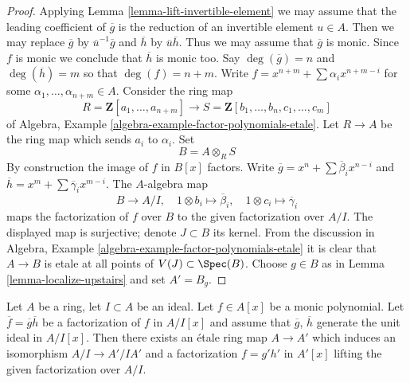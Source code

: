 \begin{proof}
Applying Lemma \ref{lemma-lift-invertible-element} we may assume that
the leading coefficient of $\overline{g}$ is the reduction of an
invertible element $u \in A$. Then we may replace $\overline{g}$ by
$\overline{u}^{-1}\overline{g}$ and $\overline{h}$ by
$\overline{u}\overline{h}$. Thus we may assume that $\overline{g}$
is monic. Since $f$ is monic we conclude that $\overline{h}$ is monic
too. Say $\deg(\overline{g}) = n$ and $\deg(\overline{h}) = m$ so
that $\deg(f) = n + m$. Write $f = x^{n + m} + \sum \alpha_i x^{n + m - i}$
for some $\alpha_1, \ldots, \alpha_{n + m} \in A$. Consider the ring map
$$
R = \mathbf{Z}[a_1, \ldots, a_{n + m}]
\longrightarrow
S = \mathbf{Z}[b_1, \ldots, b_n, c_1, \ldots, c_m]
$$
of Algebra, Example \ref{algebra-example-factor-polynomials-etale}.
Let $R \to A$ be the ring map which sends $a_i$ to $\alpha_i$.
Set
$$
B = A \otimes_R S
$$
By construction the image of $f$ in $B[x]$ factors.
Write $\overline{g} = x^n + \sum \overline{\beta}_i x^{n - i}$ and
$\overline{h} = x^m + \sum \overline{\gamma}_i x^{m - i}$.
The $A$-algebra map
$$
B \longrightarrow A/I, \quad
1 \otimes b_i \mapsto \overline{\beta}_i, \quad
1 \otimes c_i \mapsto \overline{\gamma}_i
$$
maps the factorization of $f$ over $B$ to the given factorization over
$A/I$. The displayed map is surjective; denote $J \subset B$ its kernel.
From the discussion in 
Algebra, Example \ref{algebra-example-factor-polynomials-etale}
it is clear that $A \to B$ is etale at all points of $V(J) \subset \Spec(B)$.
Choose $g \in B$ as in Lemma \ref{lemma-localize-upstairs} and
set $A' = B_g$.
\end{proof}

\begin{lemma}
\label{lemma-lift-factorization}
Let $A$ be a ring, let $I \subset A$ be an ideal.
Let $f \in A[x]$ be a monic polynomial.
Let $\overline{f} = \overline{g} \overline{h}$ be a factorization of $f$
in $A/I[x]$ and assume that  $\overline{g}$, $\overline{h}$ generate
the unit ideal in $A/I[x]$. Then there exists an \'etale ring map
$A \to A'$ which induces an isomorphism $A/I \to A'/IA'$ and a factorization
$f = g' h'$ in $A'[x]$ lifting the given factorization over $A/I$.
\end{lemma}

